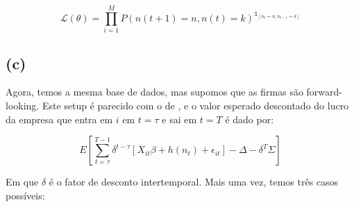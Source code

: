 \documentclass{article}
\begin{document}
\begin{equation*}
    \mathcal{L}(\theta)=\prod_{i=1}^M P(n(t+1)=n,n(t)=k)^{\mathds{1}_{[n_t=n,n_{t-1}=k]}}
\end{equation*}

\subsection*{(c)}

Agora, temos a mesma base de dados, mas supomos que as firmas são forward-looking. Este setup é parecido com o de , e o valor esperado descontado do lucro da empresa que entra em $i$ em $t = \tau$ e sai em $t = T$ é dado por:

\begin{equation*}
    E\left[\sum_{t=\tau}^{T-1} \delta^{t-\tau}[X_{it}\beta + h(n_t) + \epsilon_{it}] - \Delta - \delta^{T}\Sigma \right]
\end{equation*}

Em que $\delta$ é o fator de desconto intertemporal. Mais uma vez, temos três casos possíveis:
\end{document}
